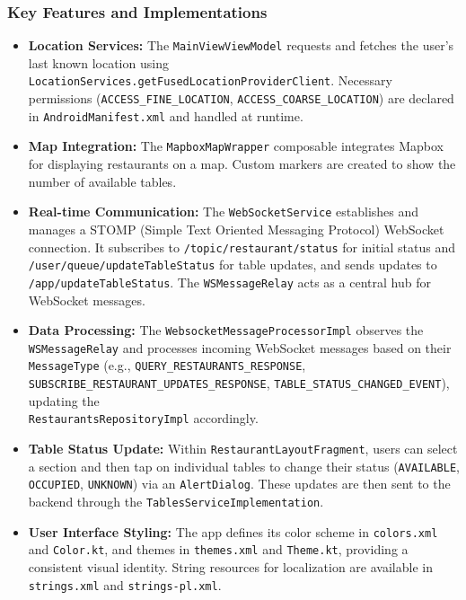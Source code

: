 \documentclass{article}
\begin{document}
\subsubsection{Key Features and Implementations}
\begin{itemize}
    \item \textbf{Location Services:} The \texttt{MainViewViewModel} requests and fetches the user's last known location using \texttt{LocationServices.getFusedLocationProviderClient}. Necessary permissions (\texttt{ACCESS\_FINE\_LOCATION}, \texttt{ACCESS\_COARSE\_LOCATION}) are declared in \texttt{AndroidManifest.xml} and handled at runtime.

    \item \textbf{Map Integration:} The \texttt{MapboxMapWrapper} composable integrates Mapbox for displaying restaurants on a map. Custom markers are created to show the number of available tables.

    \item \textbf{Real-time Communication:} The \texttt{WebSocketService} establishes and manages a STOMP (Simple Text Oriented Messaging Protocol) WebSocket connection. It subscribes to \texttt{/topic/restaurant/status} for initial status and \texttt{/user/queue/updateTableStatus} for table updates, and sends updates to \texttt{/app/updateTableStatus}. The \texttt{WSMessageRelay} acts as a central hub for WebSocket messages.

    \item \textbf{Data Processing:} The \texttt{WebsocketMessageProcessorImpl} observes the \texttt{WSMessageRelay} and processes incoming WebSocket messages based on their \texttt{MessageType} (e.g., \texttt{QUERY\_RESTAURANTS\_RESPONSE}, \texttt{SUBSCRIBE\_RESTAURANT\_UPDATES\_RESPONSE}, \texttt{TABLE\_STATUS\_CHANGED\_EVENT}), updating the \\ \texttt{RestaurantsRepositoryImpl} accordingly.

    \item \textbf{Table Status Update:} Within \texttt{RestaurantLayoutFragment}, users can select a section and then tap on individual tables to change their status (\texttt{AVAILABLE}, \texttt{OCCUPIED}, \texttt{UNKNOWN}) via an \texttt{AlertDialog}. These updates are then sent to the backend through the \texttt{TablesServiceImplementation}.

    \item \textbf{User Interface Styling:} The app defines its color scheme in \texttt{colors.xml} and \texttt{Color.kt}, and themes in \texttt{themes.xml} and \texttt{Theme.kt}, providing a consistent visual identity. String resources for localization are available in \texttt{strings.xml} and \texttt{strings-pl.xml}.
\end{itemize}
\end{document}
